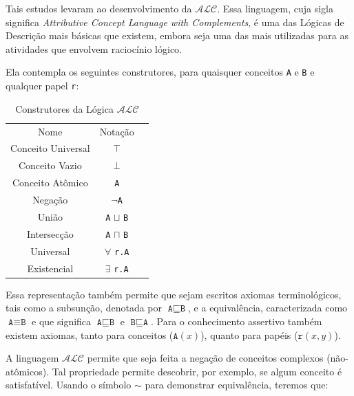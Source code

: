 Tais estudos levaram ao desenvolvimento da $\mathcal{ALC}$. Essa linguagem, cuja sigla significa \textit{Attributive Concept Language with Complements}, é uma das Lógicas de Descrição mais básicas que existem, embora seja uma das mais utilizadas para as atividades que envolvem raciocínio lógico. 

Ela contempla os seguintes construtores, para quaisquer conceitos \texttt{A} e \texttt{B} e qualquer papel \texttt{r}:

\begin{table}[H]
	\centering
	\begin{tabular}{|c|c|l}
		\cline{1-2}
		Nome        & Notação                               &  \\ \cline{1-2}
		Conceito Universal      & $ \top $                            &  \\ \cline{1-2}
		Conceito Vazio      & $ \bot $                            &  \\ \cline{1-2}
		Conceito Atômico      & \texttt{A}                            &  \\ \cline{1-2}
		Negação      & $ \neg $\texttt{A}                            &  \\ \cline{1-2}
		União       & \texttt{A} $ \sqcup $ \texttt{B}      &  \\ \cline{1-2}
		Intersecção & \texttt{A} $ \sqcap $ \texttt{B}      &  \\ \cline{1-2}
		Universal   & $\forall$ \texttt{r.A}                &  \\ \cline{1-2}
		Existencial & $\exists$ \texttt{r.A}                &  \\ \cline{1-2}
	\end{tabular}
	\caption{Construtores da Lógica $ \mathcal{ALC} $}
\end{table}

Essa representação também permite que sejam escritos axiomas terminológicos, tais como a subsunção, denotada por $ \texttt{A} \sqsubseteq \texttt{B} $, e a equivalência, caracterizada como $ \texttt{A} \equiv \texttt{B} $ e que significa $ \texttt{A} \sqsubseteq \texttt{B} $ e $ \texttt{B} \sqsubseteq \texttt{A} $. Para o conhecimento assertivo também existem axiomas, tanto para conceitos ($\texttt{A}(x)$), quanto para papéis ($\texttt{r}(x,y)$).

A linguagem $\mathcal{ALC}$ permite que seja feita a negação de conceitos complexos (não-atômicos). Tal propriedade permite descobrir, por exemplo, se algum conceito é satisfatível. Usando o símbolo $ \sim $ para demonstrar equivalência, teremos que:

